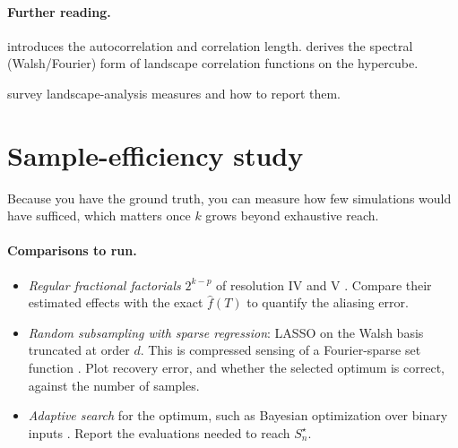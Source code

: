 \documentclass[11pt]{article}
\newcommand{\fh}{\widehat{f}}
\begin{document}
\paragraph{Further reading.}
\begin{reading}
  \item[Mathematics.] \textcite{Weinberger1990} introduces the autocorrelation and correlation length.
        \textcite{Stadler1996} derives the spectral (Walsh/Fourier) form of landscape correlation functions on the hypercube.
  \item[Applying it.] \textcite{MalanEngelbrecht2013} survey landscape-analysis measures and how to report them.
\end{reading}

\section{Sample-efficiency study}\label{sec:sample}

Because you have the ground truth, you can measure how few simulations would have sufficed, which matters once $k$ grows beyond exhaustive reach.

\paragraph{Comparisons to run.}
\begin{itemize}[itemsep=2pt]
  \item \emph{Regular fractional factorials} $2^{k-p}$ of resolution IV and V \parencite{BoxHunter1961}.
        Compare their estimated effects with the exact $\fh(T)$ to quantify the aliasing error.
  \item \emph{Random subsampling with sparse regression}: LASSO \parencite{Tibshirani1996} on the Walsh basis truncated at order $d$.
        This is compressed sensing of a Fourier-sparse set function \parencite{StobbeKrause2012,Amrollahi2019}.
        Plot recovery error, and whether the selected optimum is correct, against the number of samples.
  \item \emph{Adaptive search} for the optimum, such as Bayesian optimization over binary inputs \parencite{BaptistaPoloczek2018}.
        Report the evaluations needed to reach $S_n^\star$.
\end{itemize}
\end{document}
